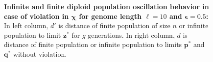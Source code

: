 \begin{figure}[h]
\begin{center}
\hspace{-3em}%
\vspace{-0.5em}  \hspace{-3em}%


\caption[\textbf{Infinite and finite diploid population oscillation behavior in case of violation in $\bm{\chi}$ for genome length $\ell = 10$ and $\bm{\epsilon} = 0.5$}]{\textbf{Infinite and finite diploid population oscillation behavior in case of violation in $\bm{\chi}$ for genome length $\ell = 10$ and $\bm{\epsilon} = 0.5$:} 
  In left column, $d'$ is distance of finite population of size $n$ or infinite population to limit $\bm{z}^\ast$ for $g$ generations. In right column, $d$ is distance of finite population or infinite population to limits $\bm{p}^\ast$ and $\bm{q}^\ast$ without violation.}
\label{oscillation_10d_vio_chi_0.5}
\end{center}
\end{figure}

